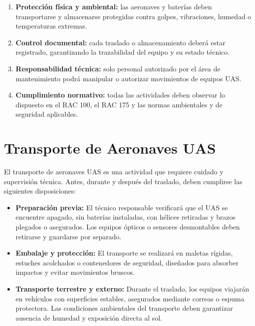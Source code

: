 \begin{enumerate}
    \item \textbf{Protección física y ambiental:} las aeronaves y baterías deben transportarse y almacenarse protegidas contra golpes, vibraciones, humedad o temperaturas extremas.

    \item \textbf{Control documental:} cada traslado o almacenamiento deberá estar registrado, garantizando la trazabilidad del equipo y su estado técnico.

    \item \textbf{Responsabilidad técnica:} solo personal autorizado por el área de mantenimiento podrá manipular o autorizar movimientos de equipos UAS.

    \item \textbf{Cumplimiento normativo:} todas las actividades deben observar lo dispuesto en el RAC 100, el RAC 175 y las normas ambientales y de seguridad aplicables.
\end{enumerate}

\section{Transporte de Aeronaves UAS}

El transporte de aeronaves UAS es una actividad que requiere cuidado y supervisión técnica. Antes, durante y después del traslado, deben cumplirse las siguientes disposiciones:

\begin{itemize}
    \item \textbf{Preparación previa:} El técnico responsable verificará que el UAS se encuentre apagado, sin baterías instaladas, con hélices retiradas y brazos plegados o asegurados. Los equipos ópticos o sensores desmontables deben retirarse y guardarse por separado.

    \item \textbf{Embalaje y protección:} El transporte se realizará en maletas rígidas, estuches acolchados o contenedores de seguridad, diseñados para absorber impactos y evitar movimientos bruscos.

    \item \textbf{Transporte terrestre y externo:} Durante el traslado, los equipos viajarán en vehículos con superficies estables, asegurados mediante correas o espuma protectora. Las condiciones ambientales del transporte deben garantizar ausencia de humedad y exposición directa al sol.

\end{itemize}

